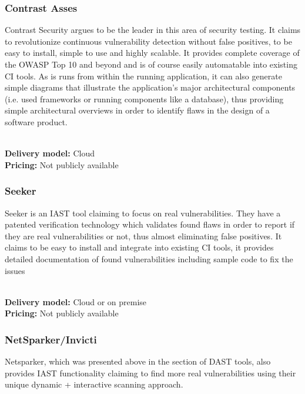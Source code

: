 \documentclass[conference]{IEEEtran}
\begin{document}
\subsubsection{Contrast Asses \cite{iast1}}

Contrast Security argues to be the leader in this area of security testing. It claims to revolutionize continuous vulnerability detection without false positives, to be easy to install, simple to use and highly scalable. It provides complete coverage of the OWASP Top 10 and beyond and is of course easily automatable into existing CI tools. As is runs from within the running application, it can also generate simple diagrams that illustrate the application’s major architectural components (i.e. used frameworks or running components like a database), thus providing simple architectural overviews in order to identify flaws in the design of a software product.

\noindent\\
\textbf{Delivery model:} Cloud
\noindent\\
\textbf{Pricing:} Not publicly available
\\

\subsubsection{Seeker \cite{iast2}}

Seeker is an IAST tool claiming to focus on real vulnerabilities. They have a patented verification technology which validates found flaws in order to report if they are real vulnerabilities or not, thus almost eliminating false positives. It claims to be easy to install and integrate into existing CI tools, it provides detailed documentation of found vulnerabilities including sample code to fix the issues

\noindent\\
\textbf{Delivery model:} Cloud or on premise
\noindent\\
\textbf{Pricing:} Not publicly available
\\

\subsubsection{NetSparker/Invicti \cite{dast1}}

Netsparker, which was presented above in the section of DAST tools, also provides IAST functionality claiming to find more real vulnerabilities using their unique dynamic + interactive scanning approach.\\
\end{document}
